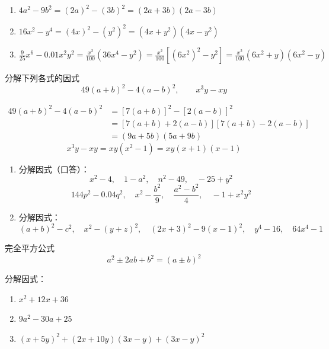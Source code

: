 \begin{solution}
\begin{enumerate}
    \item $4a^2-9b^2=(2a)^2-(3b)^2=(2a+3b)(2a-3b)$
    \item $16x^2-y^4=(4x)^2-(y^2)^2=(4x+y^2)(4x-y^2)$
    \item $\frac{9}{25}x^6-0.01 x^2y^2=\frac{x^2}{100}(36x^4-y^2)=\frac{x^2}{100}[(6x^2)^2-y^2]=\frac{x^2}{100}(6x^2+y)(6x^2-y)$
\end{enumerate}    
\end{solution}

\begin{example}
分解下列各式的因式
\[49(a+b)^2-4(a-b)^2,\qquad x^3y-xy\]
\end{example}

\begin{solution}
\[\begin{split}
    49(a+b)^2-4(a-b)^2&=[7(a+b)]^2-[2(a-b)]^2\\
    &=[7(a+b)+2(a-b)][7(a+b)-2(a-b)]\\
    &=(9a+5b)(5a+9b)
\end{split}\]
\[x^3y-xy=xy(x^2-1)=xy(x+1)(x-1)\]    
\end{solution}

\begin{ex}
\begin{enumerate}
    \item 分解因式（口答）：
    \[x^2-4,\quad 1-a^2,\quad n^2-49,\quad -25+y^2 \]
    \[144p^2-0.04q^2,\quad x^2-\frac{b^2}{9},\quad \frac{a^2-b^2}{4},\quad -1+x^2y^2\]
    \item 分解因式：
    \[(a+b)^2-c^2,\quad x^2-(y+z)^2,\quad (2x+3)^2-9(x-1)^2,\quad y^4-16,\quad 64x^4-1 \]
\end{enumerate}
\end{ex}

\begin{blk}{完全平方公式}
    \[a^2\pm 2ab+b^2=(a\pm b)^2\]
\end{blk}

\begin{example}
分解因式：
\begin{enumerate}
    \item $x^2+12x+36$
    \item $9a^2-30a+25$
    \item $(x+5y)^2+(2x+10y)(3x-y)+(3x-y)^2$
\end{enumerate}
\end{example}

